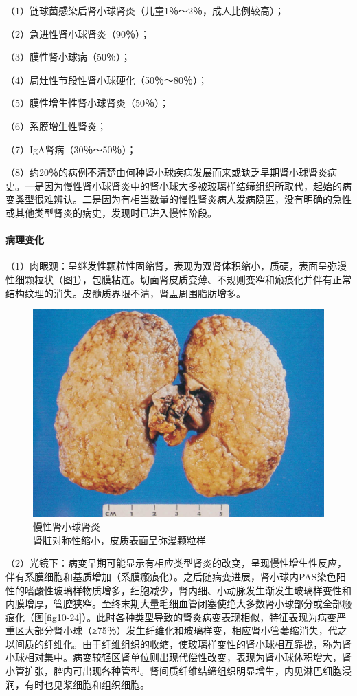 （1）链球菌感染后肾小球肾炎（儿童1％～2％，成人比例较高）；

（2）急进性肾小球肾炎（90％）；

（3）膜性肾小球病（50％）；

（4）局灶性节段性肾小球硬化（50％～80％）；

（5）膜性增生性肾小球肾炎（50％）；

（6）系膜增生性肾炎；

（7）IgA肾病（30％～50％）；

（8）约20％的病例不清楚由何种肾小球疾病发展而来或缺乏早期肾小球肾炎病史。一是因为慢性肾小球肾炎中的肾小球大多被玻璃样结缔组织所取代，起始的病变类型很难辨认。二是因为有相当数量的慢性肾炎病人发病隐匿，没有明确的急性或其他类型肾炎的病史，发现时已进入慢性阶段。

\paragraph{病理变化}
（1）肉眼观：呈继发性颗粒性固缩肾，表现为双肾体积缩小，质硬，表面呈弥漫性细颗粒状（图\ref{fig10-23}），包膜粘连。切面肾皮质变薄、不规则变窄和瘢痕化并伴有正常结构纹理的消失。皮髓质界限不清，肾盂周围脂肪增多。

\begin{figure}[!htbp]
 \centering
 \includegraphics{./images/Image00171.jpg}
 \captionsetup{justification=centering}
 \caption{慢性肾小球肾炎\\ {\small 肾脏对称性缩小，皮质表面呈弥漫颗粒样}}
\label{fig10-23}
  \end{figure}

（2）光镜下：病变早期可能显示有相应类型肾炎的改变，呈现慢性增生性反应，伴有系膜细胞和基质增加（系膜瘢痕化）。之后随病变进展，肾小球内PAS染色阳性的嗜酸性玻璃样物质增多，细胞减少，肾内细、小动脉发生渐发生玻璃样变性和内膜增厚，管腔狭窄。至终末期大量毛细血管闭塞使绝大多数肾小球部分或全部瘢痕化（图\ref{fig10-24}）。此时各种类型导致的肾炎病变表现相似，特征表现为病变严重区大部分肾小球（≥75％）发生纤维化和玻璃样变，相应肾小管萎缩消失，代之以间质的纤维化。由于纤维组织的收缩，使玻璃样变性的肾小球相互靠拢，称为肾小球相对集中。病变较轻区肾单位则出现代偿性改变，表现为肾小球体积增大，肾小管扩张，腔内可出现各种管型。肾间质纤维结缔组织明显增生，内见淋巴细胞浸润，有时也见浆细胞和组织细胞。

